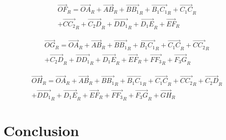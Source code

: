 \documentclass[12pt,a4paper]{article}
\begin{document}
\begin{equation}
\begin{split}
\vec{OF}_R=\vec{OA}_R+\vec{AB}_R+\vec{B B_1}_R+\vec{B_1 C_1}_R+\vec{C_1 C}_R\\+\vec{C C_2}_R+\vec{C_2 D}_R+\vec{D D_1}_R+\vec{D_1 E}_R+\vec{E F}_R
\end{split}
\end{equation}

\begin{equation}
\begin{split}
\vec{OG}_R=\vec{OA}_R+\vec{AB}_R+\vec{B B_1}_R+\vec{B_1 C_1}_R+\vec{C_1 C}_R+\vec{C C_2}_R\\+\vec{C_2 D}_R+\vec{D D_1}_R+\vec{D_1 E}_R+\vec{E F}_R+\vec{F F_3}_R+\vec{F_3 G}_R
\end{split}
\end{equation}

\begin{equation}
\begin{split}
\vec{OH}_R=\vec{OA}_R+\vec{AB}_R+\vec{B B_1}_R+\vec{B_1 C_1}_R+\vec{C_1 C}_R+\vec{C C_2}_R+\vec{C_2 D}_R\\+\vec{D D_1}_R+\vec{D_1 E}_R+\vec{E F}_R+\vec{F F_3}_R+\vec{F_3 G}_R+\vec{G H}_R
\end{split}
\end{equation}

 
\section{Conclusion}
\end{document}
